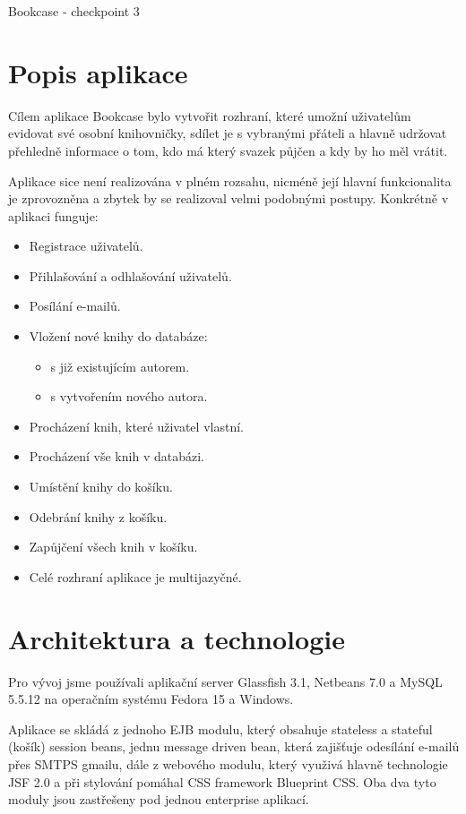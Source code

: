 \documentclass[12pt]{article}
\begin{document}
\noindent
\begin{Huge}Bookcase - checkpoint 3\end{Huge}

\section{Popis aplikace}

Cílem aplikace Bookcase bylo vytvořit rozhraní, které umožní uživatelům evidovat své osobní knihovničky, sdílet je s vybranými přáteli a hlavně udržovat přehledně informace o tom, kdo má který svazek půjčen a kdy by ho měl vrátit.

Aplikace sice není realizována v plném rozsahu, nicméně její hlavní funkcionalita je zprovozněna a zbytek by se realizoval velmi podobnými postupy. Konkrétně v aplikaci funguje:

\begin{itemize}
	\item Registrace uživatelů.
	\item Přihlašování a odhlašování uživatelů.
	\item Posílání e-mailů.
	\item Vložení nové knihy do databáze:
		\begin{itemize}
			\item s již existujícím autorem.
			\item s vytvořením nového autora.
		\end{itemize}
	\item Procházení knih, které uživatel vlastní.
	\item Procházení vše knih v databázi.
	\item Umístění knihy do košíku.
	\item Odebrání knihy z košíku.
	\item Zapůjčení všech knih v košíku.
	\item Celé rozhraní aplikace je multijazyčné.
\end{itemize} 

\section{Architektura a technologie}

Pro vývoj jsme používali aplikační server Glassfish 3.1, Netbeans 7.0 a MySQL 5.5.12 na operačním systému Fedora 15 a Windows.

Aplikace se skládá z jednoho EJB modulu, který obsahuje stateless a stateful (košík) session beans, jednu message driven bean, která zajišťuje odesílání e-mailů přes SMTPS gmailu, dále z webového modulu, který využivá hlavně technologie JSF 2.0 a při stylování pomáhal CSS framework Blueprint CSS. Oba dva tyto moduly jsou zastřešeny pod jednou enterprise aplikací.
\end{document}
